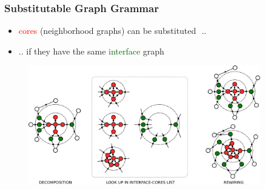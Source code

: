 \documentclass{beamer}
\newcommand{\red}[1]{\textcolor{red}{#1}}
\newcommand{\green}[1]{\textcolor{darkgreen}{#1}}
\begin{document}

\begin{frame}
    \frametitle{Substitutable Graph Grammar}
    \begin{itemize}
        \item \red{cores} (neighborhood graphs) can be substituted  ..
        \item .. if they have the same \green{interface} graph
    \end{itemize}
    \begin{figure}[ht]
        \centering
        \includegraphics[width=0.9\textwidth]{images/cip2.pdf}
    \end{figure}
\end{frame}



\end{document}

